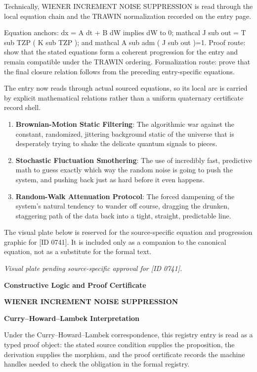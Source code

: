 Technically, WIENER INCREMENT NOISE SUPPRESSION is read through the local equation chain and the TRAWIN normalization recorded on the entry page.

Equation anchors: dx = A dt + B dW implies dW to 0; mathcal J sub out = T sub TZP ( K sub TZP ); and mathcal A sub adm ( J sub out )=1. Proof route: show that the stated equations form a coherent progression for the entry and remain compatible under the TRAWIN ordering. Formalization route: prove that the final closure relation follows from the preceding entry-specific equations.

The entry now reads through actual sourced equations, so its local arc is carried by explicit mathematical relations rather than a uniform quaternary certificate record shell.
\endgroup

\begin{enumerate}[leftmargin=1.6em,itemsep=6pt,topsep=4pt]
\item \textbf{Brownian-Motion Static Filtering}: The algorithmic war against the constant, randomized, jittering background static of the universe that is desperately trying to shake the delicate quantum signals to pieces.
\item \textbf{Stochastic Fluctuation Smothering}: The use of incredibly fast, predictive math to guess exactly which way the random noise is going to push the system, and pushing back just as hard before it even happens.
\item \textbf{Random-Walk Attenuation Protocol}: The forced dampening of the system's natural tendency to wander off course, dragging the drunken, staggering path of the data back into a tight, straight, predictable line.
\end{enumerate}

\begingroup\footnotesize\sloppy
The visual plate below is reserved for the source-specific equation and progression graphic for [ID 0741]. It is included only as a companion to the canonical equation, not as a substitute for the formal text.
\par\endgroup
\begingroup\footnotesize\itshape
Visual plate pending source-specific approval for [ID 0741].
\par\endgroup

\clearpage
\begingroup\tzpsupportsetup
\noindent\textbf{\fontsize{10.8pt}{12.8pt}\selectfont [ID 0741] Constructive Logic and Proof Certificate}\par
\noindent\textbf{\fontsize{10pt}{12pt}\selectfont WIENER INCREMENT NOISE SUPPRESSION}\par
\vspace{0.45em}
\begingroup
\footnotesize
\setlength{\parskip}{0.22em}
\setlength{\parindent}{0pt}
\noindent\textbf{Curry--Howard--Lambek Interpretation}\par
Under the Curry--Howard--Lambek correspondence, this registry entry is read as a typed proof
object: the stated source condition supplies the proposition, the derivation supplies the
morphism, and the proof certificate records the machine handles needed to check the obligation
in the formal registry.

